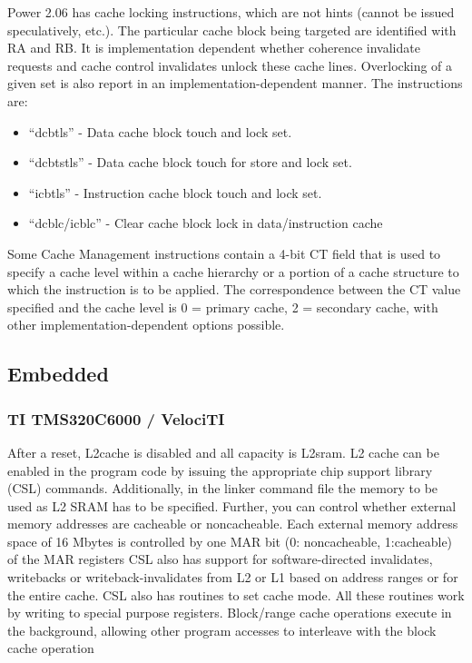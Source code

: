 Power 2.06 has cache locking instructions, which are not hints (cannot be issued speculatively, etc.). The particular cache block being targeted are identified with RA and RB. It is implementation dependent whether coherence invalidate requests and cache control invalidates unlock these cache lines. Overlocking of a given set is also report in an implementation-dependent manner. The instructions are:
\begin{itemize}
\item ``dcbtls'' - Data cache block touch and lock set.
\item ``dcbtstls'' - Data cache block touch for store and lock set.
\item ``icbtls'' - Instruction cache block touch and lock set.
\item ``dcblc/icblc'' - Clear cache block lock in data/instruction cache
\end{itemize}

Some Cache Management instructions contain a 4-bit CT field that is used to specify a cache level within a cache hierarchy or a portion of a cache structure to which the instruction is to be applied. The correspondence between the CT value specified and the cache level is 0 = primary cache, 2 = secondary cache, with other implementation-dependent  options possible.

\subsection{Embedded}
\subsubsection{TI TMS320C6000 / VelociTI}
After a reset, L2cache is disabled and all capacity is L2sram. L2 cache can be enabled in the program code by issuing the appropriate chip support library (CSL) commands. Additionally, in
the linker command file the memory to be used as L2 SRAM has to be specified.
Further, you can control whether external memory addresses are cacheable or noncacheable. Each external memory address space of 16 Mbytes is controlled by one MAR bit (0: noncacheable, 1:cacheable) of the MAR registers
CSL also has support for software-directed invalidates, writebacks or writeback-invalidates from L2 or L1 based on address ranges or for the entire cache. CSL also has routines to set cache mode. All these routines work by writing to special purpose registers. Block/range cache operations execute in the background, allowing other
program accesses to interleave with the block cache operation

